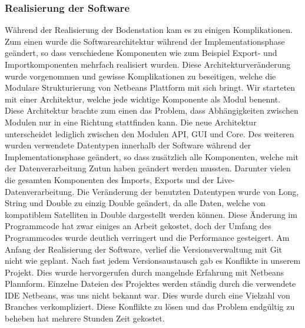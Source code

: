 \subsubsection{Realisierung der Software}
Während der Realisierung der Bodenstation kam es zu einigen Komplikationen. Zum einen wurde die Softwarearchitektur während der Implementationsphase geändert, so dass verschiedene Komponenten wie zum Beispiel Export- und Importkomponenten mehrfach realisiert wurden. Diese Architekturveränderung wurde vorgenommen und gewisse Komplikationen zu beseitigen, welche die Modulare Strukturierung von Netbeans Plattform mit sich bringt. Wir starteten mit einer Architektur, welche jede wichtige Komponente als Modul benennt. Diese Architektur brachte zum einen das Problem, dass Abhängigkeiten zwischen Modulen nur in eine Richtung stattfinden kann. Die neue Architektur unterscheidet lediglich zwischen den Modulen API, GUI und Core. Des weiteren wurden verwendete Datentypen innerhalb der Software während der Implementationsphase geändert, so dass zusätzlich alle Komponenten, welche mit der Datenverarbeitung Zutun haben geändert werden mussten. Darunter vielen die gesamten Komponenten des Imports, Exports und der Live-Datenverarbeitung. Die Veränderung der benutzten Datentypen wurde von Long, String und Double zu einzig Double geändert, da alle Daten, welche von kompatiblem Satelliten in Double dargestellt werden können. Diese Änderung im Programmcode hat zwar einiges an Arbeit gekostet, doch der Umfang des Programmcodes wurde deutlich verringert und die Performance gesteigert. Am Anfang der Realisierung der Software, verlief die Versionsverwaltung mit Git nicht wie geplant. Nach fast jedem Versionsaustausch gab es Konflikte in unserem Projekt. Dies wurde hervorgerufen durch mangelnde Erfahrung mit Netbeans Plannform. Einzelne Dateien des Projektes werden ständig durch die verwendete IDE Netbeans, was uns nicht bekannt war. Dies wurde durch eine Vielzahl von Branches verkompliziert. Diese Konflikte zu lösen und das Problem endgültig zu beheben hat mehrere Stunden Zeit gekostet.